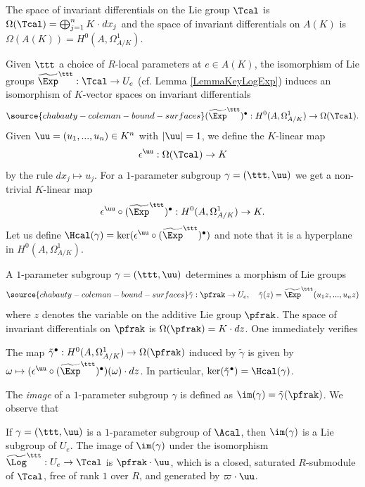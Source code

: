 The space of invariant differentials on the Lie group $\Tcal$ is $\Omega(\Tcal) = \bigoplus_{j=1}^n K\cdot dx_j$ and the space of invariant differentials on $A(K)$ is $ \Omega(A(K))=H^0(A,\Omega^1_{A/K})$.

 Given $\ttt$  a choice of $R$-local parameters at $e\in A(K)$, the isomorphism of Lie groups $\widetilde{\Exp}^\ttt:\Tcal\to U_e$ (cf. Lemma \ref{LemmaKeyLogExp}) induces an isomorphism of $K$-vector spaces on invariant differentials
\begin{equation}\label{Eqnzxc}
\source{chabauty-coleman-bound-surfaces}
(\widetilde{\Exp}^\ttt)^\bullet : H^0(A,\Omega^1_{A/K})\to \Omega(\Tcal).
\end{equation}
Given $\uu=(u_1,...,u_n)\in K^n$ with $|\uu|=1$, we define the $K$-linear map
$$
\epsilon^\uu: \Omega(\Tcal)\to K
$$
by the rule $dx_j\mapsto u_j$. For a $1$-parameter subgroup $\gamma=(\ttt,\uu)$ we get a non-trivial $K$-linear map
$$
\epsilon^\uu\circ (\widetilde{\Exp}^\ttt)^\bullet: H^0(A,\Omega^1_{A/K})\to K.
$$
Let us define $\Hcal(\gamma)=\ker(\epsilon^\uu\circ (\widetilde{\Exp}^\ttt)^\bullet)$ and note that it is a hyperplane in $H^0(A,\Omega^1_{A/K})$.

A $1$-parameter subgroup $\gamma=(\ttt,\uu)$ determines a morphism of Lie groups
\begin{equation}\label{Eqntildegamma}
\source{chabauty-coleman-bound-surfaces}
\tilde{\gamma}:\pfrak \to U_e, \quad \tilde{\gamma}(z)=\widetilde{\Exp}^\ttt(u_1z,...,u_nz)
\end{equation}
where $z$ denotes the variable on the additive Lie group $\pfrak$. The space of invariant differentials on $\pfrak$ is $\Omega(\pfrak) = K\cdot dz$. One immediately verifies
\begin{lemma}
\notready\label{LemmaHisKernel} The map $\tilde{\gamma}^\bullet : H^0(A,\Omega^1_{A/K})\to \Omega(\pfrak)$ induced by $\tilde{\gamma}$  is given by $\omega\mapsto (\epsilon^\uu\circ (\widetilde{\Exp}^\ttt)^\bullet)(\omega)\cdot dz$. In particular, $\ker(\tilde{\gamma}^\bullet)=\Hcal(\gamma)$.
\end{lemma}
The \emph{image} of a $1$-parameter subgroup $\gamma$ is defined as $\im(\gamma)=\tilde{\gamma}(\pfrak)$. We observe that
\begin{lemma}
\notready\label{LemmaSaturated} If $\gamma=(\ttt,\uu)$ is a $1$-parameter subgroup of $\Acal$, then $\im(\gamma)$ is a Lie subgroup of $U_e$. The image of $\im(\gamma)$ under the isomorphism $\widetilde{\Log}^\ttt:U_e\to \Tcal$ is $\pfrak\cdot \uu$, which is a closed, saturated $R$-submodule of $\Tcal$, free of rank $1$ over $R$, and generated by $\varpi\cdot \uu$.
\end{lemma}



